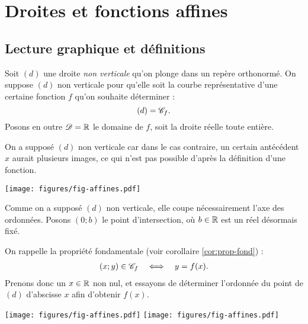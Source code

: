 
\chapter{Droites et fonctions affines}





\section{Lecture graphique et définitions}\label{sec:aff-1}

Soit $(d)$ une droite \emph{non verticale} qu'on plonge dans un repère orthonormé.
On suppose $(d)$ non verticale pour qu'elle soit la courbe représentative d'une certaine fonction $f$ qu'on souhaite déterminer : \[(d) = \mathcal{C}_f. \]
Posons en outre $\mathcal{D} = \mathbb{R}$ le domaine de $f$, soit la droite réelle toute entière.

On a supposé $(d)$ non verticale car dans le cas contraire, un certain antécédent $x$ aurait plusieurs images, ce qui n'est pas possible d'après la définition d'une fonction.


	\begin{center}
	\texttt{[image: figures/fig-affines.pdf]}
	\end{center}

Comme on a supposé $(d)$ non verticale, elle coupe nécessairement l'axe des ordonnées.
Posons $(0; b)$ le point d'intersection, où $b\in\mathbb{R}$ est un réel désormais fixé.

On rappelle la propriété fondamentale (voir corollaire \ref{cor:prop-fond}) : 
	\begin{align*}
		(x;y) \in \mathcal{C}_f && \iff && y = f(x).
	\end{align*}
Prenons donc un $x \in \mathbb{R}$ non nul, et essayons de déterminer l'ordonnée du point de $(d)$ d'abscisse $x$ afin d'obtenir $f(x)$.

	\begin{center}
	\texttt{[image: figures/fig-affines.pdf]}
	\hfill
	\texttt{[image: figures/fig-affines.pdf]}
	\end{center}
	
